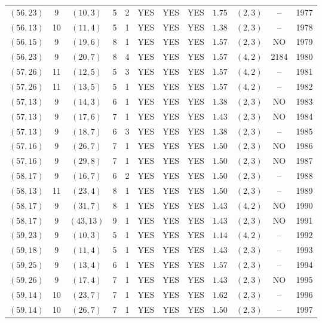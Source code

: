 \begin{longtable}{|c|c|c|c|c|c|c|c|c|c|c|c|}
$(56,23)$ & 9 & $(10,3)$ & 5 & 2 & YES & YES & YES & $1.75$ & $(2,3)$ & -- & 1977\\
$(56,13)$ & 10 & $(11,4)$ & 5 & 1 & YES & YES & YES & $1.38$ & $(2,3)$ & -- & 1978\\
$(56,15)$ & 9 & $(19,6)$ & 8 & 1 & YES & YES & YES & $1.57$ & $(2,3)$ & NO & 1979\\
$(56,23)$ & 9 & $(20,7)$ & 8 & 4 & YES & YES & YES & $1.57$ & $(4,2)$ & 2184 & 1980\\
$(57,26)$ & 11 & $(12,5)$ & 5 & 3 & YES & YES & YES & $1.57$ & $(4,2)$ & -- & 1981\\
$(57,26)$ & 11 & $(13,5)$ & 5 & 1 & YES & YES & YES & $1.57$ & $(4,2)$ & -- & 1982\\
$(57,13)$ & 9 & $(14,3)$ & 6 & 1 & YES & YES & YES & $1.38$ & $(2,3)$ & NO & 1983\\
$(57,13)$ & 9 & $(17,6)$ & 7 & 1 & YES & YES & YES & $1.43$ & $(2,3)$ & NO & 1984\\
$(57,13)$ & 9 & $(18,7)$ & 6 & 3 & YES & YES & YES & $1.38$ & $(2,3)$ & -- & 1985\\
$(57,16)$ & 9 & $(26,7)$ & 7 & 1 & YES & YES & YES & $1.50$ & $(2,3)$ & NO & 1986\\
$(57,16)$ & 9 & $(29,8)$ & 7 & 1 & YES & YES & YES & $1.50$ & $(2,3)$ & NO & 1987\\
$(58,17)$ & 9 & $(16,7)$ & 6 & 2 & YES & YES & YES & $1.50$ & $(2,3)$ & -- & 1988\\
$(58,13)$ & 11 & $(23,4)$ & 8 & 1 & YES & YES & YES & $1.50$ & $(2,3)$ & -- & 1989\\
$(58,17)$ & 9 & $(31,7)$ & 8 & 1 & YES & YES & YES & $1.43$ & $(4,2)$ & NO & 1990\\
$(58,17)$ & 9 & $(43,13)$ & 9 & 1 & YES & YES & YES & $1.43$ & $(2,3)$ & NO & 1991\\
$(59,23)$ & 9 & $(10,3)$ & 5 & 1 & YES & YES & YES & $1.14$ & $(4,2)$ & -- & 1992\\
$(59,18)$ & 9 & $(11,4)$ & 5 & 1 & YES & YES & YES & $1.43$ & $(2,3)$ & -- & 1993\\
$(59,25)$ & 9 & $(13,4)$ & 6 & 1 & YES & YES & YES & $1.57$ & $(2,3)$ & -- & 1994\\
$(59,26)$ & 9 & $(17,4)$ & 7 & 1 & YES & YES & YES & $1.43$ & $(2,3)$ & NO & 1995\\
$(59,14)$ & 10 & $(23,7)$ & 7 & 1 & YES & YES & YES & $1.62$ & $(2,3)$ & -- & 1996\\
$(59,14)$ & 10 & $(26,7)$ & 7 & 1 & YES & YES & YES & $1.50$ & $(2,3)$ & -- & 1997\\

\end{longtable}
